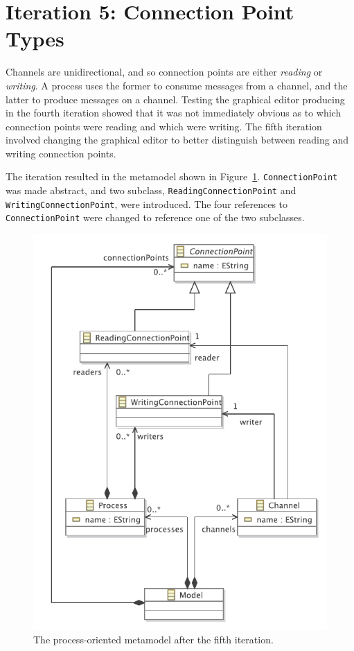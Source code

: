\clearpage

\section{Iteration 5: Connection Point Types}
\label{sec:po_it5}
Channels are unidirectional, and so connection points are either \emph{reading} or \emph{writing}. A process uses the former to consume messages from a channel, and the latter to produce messages on a channel. Testing the graphical editor producing in the fourth iteration showed that it was not immediately obvious as to which connection points were reading and which were writing. The fifth iteration involved changing the graphical editor to better distinguish between reading and writing connection points.

The iteration resulted in the metamodel shown in Figure~\ref{fig:po_it5_mm}. \texttt{Co\-nn\-ec\-ti\-o\-nP\-oi\-nt} was made abstract, and two subclass, \texttt{Re\-a\-di\-ngCo\-nn\-ec\-ti\-o\-nP\-oi\-nt} and \texttt{Wr\-i\-ti\-ngCo\-nn\-ec\-ti\-o\-nP\-oi\-nt}, were introduced. The four references to \texttt{Co\-nn\-ec\-ti\-o\-nP\-oi\-nt} were changed to reference one of the two subclasses.

\begin{figure}[htbp]
	\centering
		\includegraphics[scale=0.75]{A.2.ProcessOriented/images/5_mm.pdf}
	\caption{The process-oriented metamodel after the fifth iteration.}
	\label{fig:po_it5_mm}
\end{figure}

